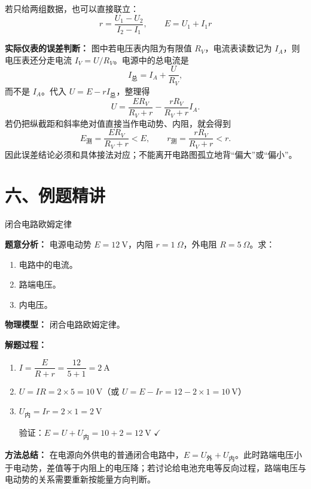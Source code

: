 \begin{center}


\label{fig:source-ui-data-fit}
\end{center}

若只给两组数据，也可以直接联立：
\[
r=\frac{U_1-U_2}{I_2-I_1},\qquad E=U_1+I_1r
\]

\textbf{实际仪表的误差判断：} 图中若电压表内阻为有限值 $R_V$，电流表读数记为 $I_A$，则电压表还分走电流 $I_V=U/R_V$。电源中的总电流是
\[
I_{\text{总}}=I_A+\frac{U}{R_V},
\]
而不是 $I_A$。代入 $U=E-rI_{\text{总}}$，整理得
\[
U=\frac{ER_V}{R_V+r}-\frac{rR_V}{R_V+r}I_A.
\]
若仍把纵截距和斜率绝对值直接当作电动势、内阻，就会得到
\[
E_{\text{测}}=\frac{ER_V}{R_V+r}<E,\qquad
r_{\text{测}}=\frac{rR_V}{R_V+r}<r.
\]
因此误差结论必须和具体接法对应；不能离开电路图孤立地背“偏大”或“偏小”。

\section*{六、例题精讲}

\begin{examplebox}{闭合电路欧姆定律}

\textbf{题意分析：} 电源电动势 $E = 12\ \mathrm{V}$，内阻 $r = 1\ \Omega$，外电阻 $R = 5\ \Omega$。求：
\begin{enumerate}
  \item 电路中的电流。
  \item 路端电压。
  \item 内电压。
\end{enumerate}

\textbf{物理模型：} 闭合电路欧姆定律。

\begin{center}


\label{fig:closed-circuit-example-basic}
\end{center}

\textbf{解题过程：}

\begin{enumerate}
  \item $I = \dfrac{E}{R+r} = \dfrac{12}{5+1} = 2\ \mathrm{A}$

  \item $U = IR = 2 \times 5 = 10\ \mathrm{V}$（或 $U = E - Ir = 12 - 2 \times 1 = 10\ \mathrm{V}$）

  \item $U_{\text{内}} = Ir = 2 \times 1 = 2\ \mathrm{V}$

  验证：$E = U + U_{\text{内}} = 10 + 2 = 12\ \mathrm{V}$ $\checkmark$
\end{enumerate}

\textbf{方法总结：} 在电源向外供电的普通闭合电路中，$E = U_{\text{外}} + U_{\text{内}}$。此时路端电压小于电动势，差值等于内阻上的电压降；若讨论给电池充电等反向过程，路端电压与电动势的关系需要重新按能量方向判断。

\end{examplebox}


